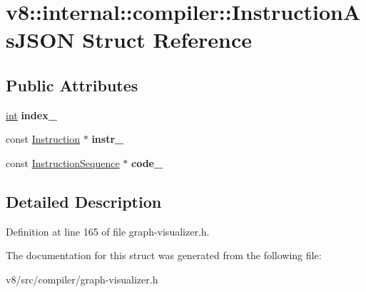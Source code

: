 \hypertarget{structv8_1_1internal_1_1compiler_1_1InstructionAsJSON}{}\section{v8\+:\+:internal\+:\+:compiler\+:\+:Instruction\+As\+J\+S\+ON Struct Reference}
\label{structv8_1_1internal_1_1compiler_1_1InstructionAsJSON}
\subsection*{Public Attributes}
\begin{DoxyCompactItemize}
\item 
\mbox{\label{structv8_1_1internal_1_1compiler_1_1InstructionAsJSON_ac8a5439f530d353eac4c558d3a75215f}} 
\mbox{\hyperlink{classint}{int}} {\bfseries index\+\_\+}
\item 
\mbox{\label{structv8_1_1internal_1_1compiler_1_1InstructionAsJSON_ae35872b5f379ad514563860deba41590}} 
const \mbox{\hyperlink{classv8_1_1internal_1_1compiler_1_1Instruction}{Instruction}} $\ast$ {\bfseries instr\+\_\+}
\item 
\mbox{\label{structv8_1_1internal_1_1compiler_1_1InstructionAsJSON_a4bb69a62adfbc180d421c03ab62c1ce8}} 
const \mbox{\hyperlink{classv8_1_1internal_1_1compiler_1_1InstructionSequence}{Instruction\+Sequence}} $\ast$ {\bfseries code\+\_\+}
\end{DoxyCompactItemize}


\subsection{Detailed Description}


Definition at line 165 of file graph-\/visualizer.\+h.



The documentation for this struct was generated from the following file\+:\begin{DoxyCompactItemize}
\item 
v8/src/compiler/graph-\/visualizer.\+h\end{DoxyCompactItemize}
